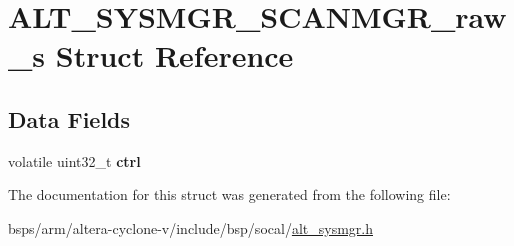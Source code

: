 \hypertarget{structALT__SYSMGR__SCANMGR__raw__s}{}\section{A\+L\+T\+\_\+\+S\+Y\+S\+M\+G\+R\+\_\+\+S\+C\+A\+N\+M\+G\+R\+\_\+raw\+\_\+s Struct Reference}
\label{structALT__SYSMGR__SCANMGR__raw__s}
\subsection*{Data Fields}
\begin{DoxyCompactItemize}
\item 
\mbox{\label{structALT__SYSMGR__SCANMGR__raw__s_aa3f57392d29268c22f0e0a92ea021e31}} 
volatile uint32\+\_\+t {\bfseries ctrl}
\end{DoxyCompactItemize}


The documentation for this struct was generated from the following file\+:\begin{DoxyCompactItemize}
\item 
bsps/arm/altera-\/cyclone-\/v/include/bsp/socal/\mbox{\hyperlink{alt__sysmgr_8h}{alt\+\_\+sysmgr.\+h}}\end{DoxyCompactItemize}
